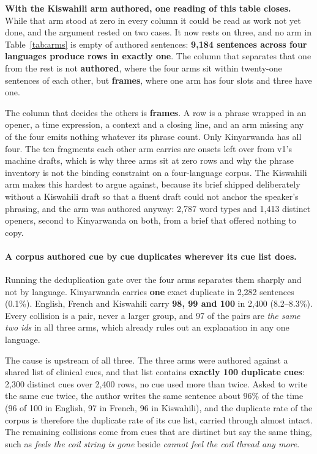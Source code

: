 \textbf{With the Kiswahili arm authored, one reading of this table closes.}
While that arm stood at zero in every column it could be read as work not yet
done, and the argument rested on two cases. It now rests on three, and no arm in
Table~\ref{tab:arms} is empty of authored sentences: \textbf{9{,}184 sentences
across four languages produce rows in exactly one}. The column that separates
that one from the rest is not \textbf{authored}, where the four arms sit within
twenty-one sentences of each other, but \textbf{frames}, where one arm has four
slots and three have one.

The column that decides the others is \textbf{frames}. A row is a phrase wrapped
in an opener, a time expression, a context and a closing line, and an arm
missing any of the four emits nothing whatever its phrase count. Only
Kinyarwanda has all four. The ten fragments each other arm carries are onsets
left over from v1's machine drafts, which is why three arms sit at zero rows and
why the phrase inventory is not the binding constraint on a four-language
corpus. The Kiswahili arm makes this hardest to argue against, because its brief
shipped deliberately without a Kiswahili draft so that a fluent draft could not
anchor the speaker's phrasing, and the arm was authored anyway: 2{,}787 word
types and 1{,}413 distinct openers, second to Kinyarwanda on both, from a brief
that offered nothing to copy.

\paragraph{A corpus authored cue by cue duplicates wherever its cue list does.}
Running the deduplication gate over the four arms separates them sharply and not
by language. Kinyarwanda carries \textbf{one} exact duplicate in 2{,}282
sentences (0.1\%). English, French and Kiswahili carry \textbf{98, 99 and 100}
in 2{,}400 (8.2--8.3\%). Every collision is a pair, never a larger group, and 97
of the pairs are \emph{the same two ids} in all three arms, which already rules
out an explanation in any one language.

The cause is upstream of all three. The three arms were authored against a
shared list of clinical cues, and that list contains \textbf{exactly 100
duplicate cues}: 2{,}300 distinct cues over 2{,}400 rows, no cue used more than
twice. Asked to write the same cue twice, the author writes the same sentence
about 96\% of the time (96 of 100 in English, 97 in French, 96 in Kiswahili),
and the duplicate rate of the corpus is therefore the duplicate rate of its
cue list, carried through almost intact. The remaining collisions come from cues
that are distinct but say the same thing, such as \emph{feels the coil string is
gone} beside \emph{cannot feel the coil thread any more}.

